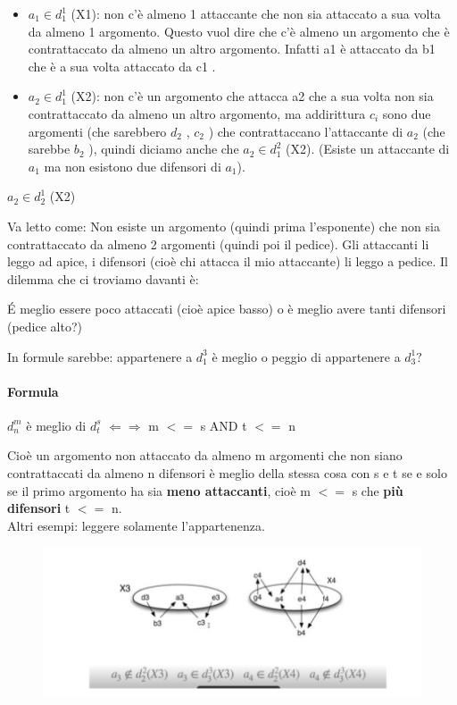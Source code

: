 \begin{itemize}
    \item $a_1 \in d^1_1$ (X1): non c'è almeno 1 attaccante che non sia
          attaccato a sua volta da almeno 1 argomento. Questo vuol dire che c'è
          almeno un argomento che è contrattaccato da almeno un altro argomento.
          Infatti a1 è attaccato da b1 che è a sua volta attaccato da c1 .
    \item $a_2 \in d^1_1$ (X2): non c'è un argomento che attacca a2 che a
          sua volta non sia contrattaccato da almeno un altro argomento, ma
          addirittura $c_i$ sono due argomenti (che sarebbero $d_2$ , $c_2$ ) che
          contrattaccano l'attaccante di $a_2$ (che sarebbe $b_2$ ), quindi
          diciamo anche che $a_2 \in d^2_1$ (X2). (Esiste un attaccante di $a_1$
          ma non esistono due difensori di $a_1$).
\end{itemize}
\begin{center}
    $a_2 \in d^1_2$ (X2)
\end{center}
Va letto come: Non esiste un argomento (quindi prima l'esponente) che non
sia contrattaccato da almeno 2 argomenti (quindi poi il pedice). Gli
attaccanti li leggo ad apice, i difensori (cioè chi attacca il mio
attaccante) li leggo a pedice. Il dilemma che ci troviamo davanti è:
\begin{center}
    É meglio essere poco attaccati (cioè apice basso) o è meglio avere tanti
    difensori (pedice alto?)
\end{center}
In formule sarebbe: appartenere a $d^3_1$ è meglio o peggio di appartenere a
$d^1_3?$

\paragraph{Formula}
\begin{center}
    $d^m_n$ è meglio di $d^s_t$ $\Leftarrow \Rightarrow$ m $<=$ s AND t $<=$
    n
\end{center}
Cioè un argomento non attaccato da almeno m argomenti che non siano
contrattaccati da almeno n difensori è meglio della stessa cosa con s e t se
e solo se il primo argomento ha sia \textbf{meno attaccanti}, cioè m $<=$ s
che \textbf{più difensori} t $<=$ n. \\Altri esempi: leggere solamente
l'appartenenza.
\begin{figure}[H]
    \centering
    \includegraphics[width=12cm, keepaspectratio]{img/Cap8/defense2.png}
\end{figure}

